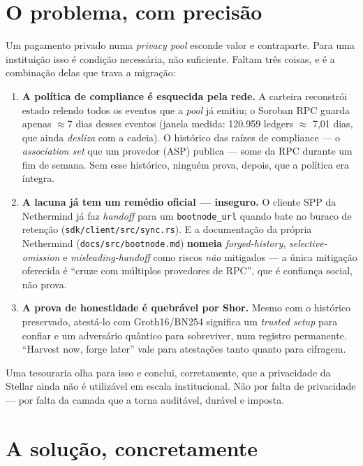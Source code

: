 \documentclass[11pt]{article}
\newcommand{\code}[1]{\texttt{\small #1}}
\begin{document}
\section{O problema, com precisão}

Um pagamento privado numa \emph{privacy pool} esconde valor e contraparte. Para
uma instituição isso é condição necessária, não suficiente. Faltam três coisas, e
é a combinação delas que trava a migração:

\begin{enumerate}[leftmargin=1.6em, itemsep=0.4em]
\item \textbf{A política de compliance é esquecida pela rede.} A carteira
reconstrói estado relendo todos os eventos que a \emph{pool} já emitiu; o Soroban
RPC guarda apenas $\approx$7 dias desses eventos (janela medida: 120.959 ledgers
$\approx$ 7,01 dias, que ainda \emph{desliza} com a cadeia). O histórico das
raízes de compliance --- o \emph{association set} que um provedor (ASP) publica ---
some da RPC durante um fim de semana. Sem esse histórico, ninguém prova, depois,
que a política era íntegra.

\item \textbf{A lacuna já tem um remédio oficial --- inseguro.} O cliente SPP da
Nethermind já faz \emph{handoff} para um \code{bootnode\_url} quando bate no buraco
de retenção (\code{sdk/client/src/sync.rs}). E a documentação da própria Nethermind
(\code{docs/src/bootnode.md}) \textbf{nomeia} \emph{forged-history},
\emph{selective-omission} e \emph{misleading-handoff} como riscos \emph{não}
mitigados --- a única mitigação oferecida é ``cruze com múltiplos provedores de
RPC'', que é confiança social, não prova.

\item \textbf{A prova de honestidade é quebrável por Shor.} Mesmo com o histórico
preservado, atestá-lo com Groth16/BN254 significa um \emph{trusted setup} para
confiar e um adversário quântico para sobreviver, num registro permanente.
``Harvest now, forge later'' vale para atestações tanto quanto para cifragem.
\end{enumerate}

Uma tesouraria olha para isso e conclui, corretamente, que a privacidade da
Stellar ainda não é utilizável em escala institucional. Não por falta de
privacidade --- por falta da camada que a torna auditável, durável e imposta.

\section{A solução, concretamente}
\end{document}
